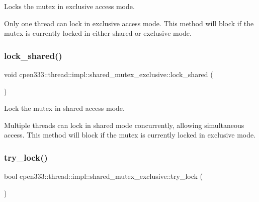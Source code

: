 Locks the mutex in exclusive access mode. 

Only one thread can lock in exclusive access mode. This method will block if the mutex is currently locked in either shared or exclusive mode. \mbox{\label{classcpen333_1_1thread_1_1impl_1_1shared__mutex__exclusive_ae934ab0e0518a0c0d4a220701f091073}} 
\subsubsection{\texorpdfstring{lock\+\_\+shared()}{lock\_shared()}}
{\footnotesize\ttfamily void cpen333\+::thread\+::impl\+::shared\+\_\+mutex\+\_\+exclusive\+::lock\+\_\+shared (\begin{DoxyParamCaption}{ }\end{DoxyParamCaption})\hspace{0.3cm}{\ttfamily [inline]}}



Lock the mutex in shared access mode. 

Multiple threads can lock in shared mode concurrently, allowing simultaneous access. This method will block if the mutex is currently locked in exclusive mode. \mbox{\label{classcpen333_1_1thread_1_1impl_1_1shared__mutex__exclusive_ae01b118cd23231f529f8666a3283380c}} 
\subsubsection{\texorpdfstring{try\+\_\+lock()}{try\_lock()}}
{\footnotesize\ttfamily bool cpen333\+::thread\+::impl\+::shared\+\_\+mutex\+\_\+exclusive\+::try\+\_\+lock (\begin{DoxyParamCaption}{ }\end{DoxyParamCaption})\hspace{0.3cm}{\ttfamily [inline]}}



